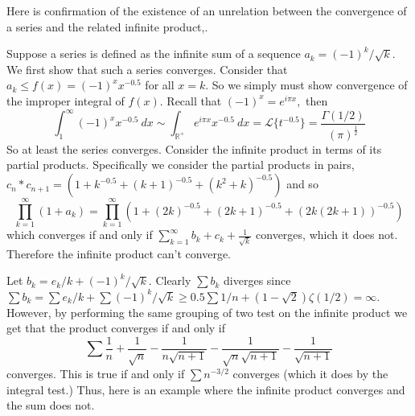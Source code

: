 \documentclass[letter]{article}
\newenvironment{menumerate}{%
  \edef\backupindent{\the\parindent}%
  \enumerate%
  \setlength{\parindent}{\backupindent}%
}{\endenumerate}
\begin{document}
\begin{menumerate}
		\setcounter{enumi}{66}
		\item %
		\item Here is confirmation of the existence of an unrelation between the convergence of a series and the related infinite product,.
		\begin{menumerate}
			\item Suppose a series is defined as the infinite sum of a sequence $a_k = (-1)^k/\sqrt{k}$. We first show that such a series converges. Consider that $a_k \leq f(x) = (-1)^xx^{-0.5}$ for all $x = k.$ So we simply must show convergence of the improper integral of $f(x)$. Recall that $(-1)^x = e^{i\pi x},$ then
			$$\int_1^\infty(-1)^xx^{-0.5}\ dx \sim \int_{\mathbb{R}^+} e^{i\pi x} x^{-0.5}\ dx = \mathcal{L}\{t^{-0.5}\} = \frac{\Gamma(1/2)}{(\pi)^{\frac{1}{2}}}$$
			So at least the series converges. Consider the infinite product in terms of its partial products. Specifically we consider the partial products in pairs, $c_n*c_{n+1} = (1 +k^{-0.5} + (k+1)^{-0.5} + (k^2+k)^{-0.5})$ and so $$\prod_{k=1}^\infty (1 + a_k)=  \prod_{k=1}^\infty (1 +(2k)^{-0.5} + (2k+1)^{-0.5} + (2k(2k+1))^{-0.5})$$  
			which converges if and only if $\sum_{k=1}^\infty b_k + c_k + \frac{1}{\sqrt k}$ converges, which it does not. Therefore the infinite product can't converge.

			\item Let $b_k = e_k/k + (-1)^k/\sqrt{k}.$ Clearly $\sum b_k$ diverges since $\sum b_k = \sum e_k/k + \sum (-1)^k/\sqrt{k} \geq 0.5\sum 1/n + (1- \sqrt{2})\zeta(1/2) = \infty.$ However, by performing the same grouping of two test on the infinite product we get that the product converges if and only if $$\sum \frac{1}{n} + \frac{1}{\sqrt{n}} - \frac{1}{n\sqrt{n+1}} - \frac{1}{\sqrt{n}\sqrt{n+1}} - \frac{1}{\sqrt{n+1}}$$ converges. This is true if and only if $\sum n^{-3/2}$ converges (which it does by the integral test.) Thus, here is an example where the infinite product converges and the sum does not.
		\end{menumerate}

		\item %
		\item %
	\end{menumerate}
\end{document}
